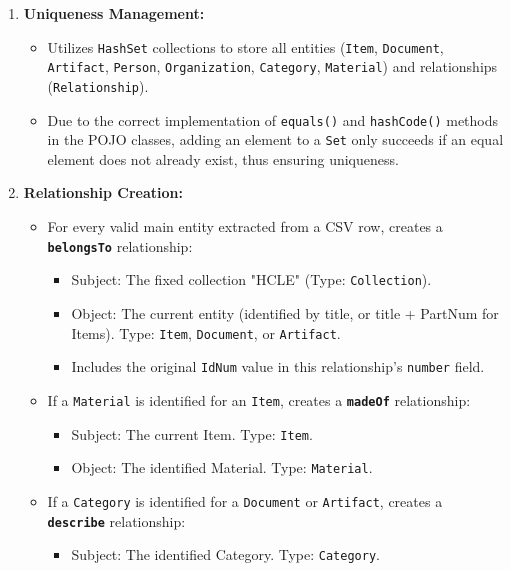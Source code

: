 \documentclass[11pt, a4paper]{article}
\begin{document}
\begin{enumerate}
    \item \textbf{Uniqueness Management:}
        \begin{itemize}
            \item Utilizes \texttt{HashSet} collections to store all entities (\texttt{Item}, \texttt{Document}, \texttt{Artifact}, \texttt{Person}, \texttt{Organization}, \texttt{Category}, \texttt{Material}) and relationships (\texttt{Relationship}).
            \item Due to the correct implementation of \texttt{equals()} and \texttt{hashCode()} methods in the POJO classes, adding an element to a \texttt{Set} only succeeds if an equal element does not already exist, thus ensuring uniqueness.
        \end{itemize}

    \item \textbf{Relationship Creation:}
        \begin{itemize}
            \item For every valid main entity extracted from a CSV row, creates a \textbf{\texttt{belongsTo}} relationship:
                \begin{itemize}
                    \item Subject: The fixed collection "HCLE" (Type: \texttt{Collection}).
                    \item Object: The current entity (identified by title, or title + PartNum for Items). Type: \texttt{Item}, \texttt{Document}, or \texttt{Artifact}.
                    \item Includes the original \texttt{IdNum} value in this relationship's \texttt{number} field.
                \end{itemize}
            \item If a \texttt{Material} is identified for an \texttt{Item}, creates a \textbf{\texttt{madeOf}} relationship:
                \begin{itemize}
                    \item Subject: The current Item. Type: \texttt{Item}.
                    \item Object: The identified Material. Type: \texttt{Material}.
                \end{itemize}
            \item If a \texttt{Category} is identified for a \texttt{Document} or \texttt{Artifact}, creates a \textbf{\texttt{describe}} relationship:
                \begin{itemize}
                    \item Subject: The identified Category. Type: \texttt{Category}.

\end{itemize}
\end{itemize}
\end{enumerate}
\end{document}
